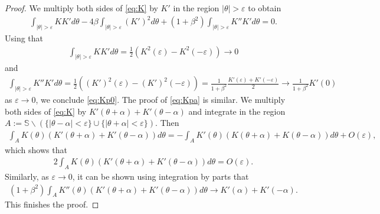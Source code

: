 \documentclass[10pt,a4paper]{amsart}
\newcommand{\alp}{\alpha}
\newcommand{\bbS}{\mathbb S}
\newcommand{\bt}{\beta}
\newcommand{\tht}{\theta}
\begin{document}
	\begin{proof}
		We multiply both sides of \eqref{eq:K} by $K'$ in the region $|\tht|>\varepsilon$ to obtain \begin{equation*}
			\begin{split}
				\int_{ |\tht |>\varepsilon} KK' d\tht - 4\bt \int_{ |\tht |>\varepsilon} (K')^2d\tht + (1+\bt^2) \int_{ |\tht |>\varepsilon} K''K' d\tht = 0. 
			\end{split}
		\end{equation*} Using that \begin{equation*}
			\begin{split}
				\int_{ |\tht |>\varepsilon} KK' d\tht = \frac12 \left( K^2(\varepsilon)-K^2(-\varepsilon) \right) \to 0
			\end{split}
		\end{equation*} and \begin{equation*}
			\begin{split}
				\int_{ |\tht |>\varepsilon} K''K' d\tht = \frac12 \left(  (K')^2(\varepsilon) - (K')^2(-\varepsilon) \right) = \frac{1}{1+\bt^2} \frac{ K'(\varepsilon) + K'(-\varepsilon) }{2} \to \frac{1}{1+\bt^2} K'(0)
			\end{split}
		\end{equation*} as $\varepsilon\to0$, we conclude \eqref{eq:Kp0}. The proof of \eqref{eq:Kpa} is similar. We multiply both sides of \eqref{eq:K} by $K'(\tht+\alp)+K'(\tht-\alp)$ and integrate in the region $A:= \bbS\backslash ( \{ |\tht-\alp|<\varepsilon \} \cup \{ |\tht+\alp|<\varepsilon \} )$. Then \begin{equation*}
			\begin{split}
				\int_A K(\tht) (K'(\tht+\alp)+K'(\tht-\alp)) d\tht  = -\int_A K'(\tht) ( K(\tht+\alp) + K(\tht-\alp) ) d\tht + O(\varepsilon),
			\end{split}
		\end{equation*} which shows that \begin{equation*}
			\begin{split}
				2\int_A K(\tht) (K'(\tht+\alp)+K'(\tht-\alp)) d\tht  = O(\varepsilon). 
			\end{split}
		\end{equation*} Similarly, as $\varepsilon\to0$, it can be shown using integration by parts that \begin{equation*}
			\begin{split}
				(1+\bt^2)\int_{A} K''(\tht)(K'(\tht+\alp)+K'(\tht-\alp)) d\tht \rightarrow K'(\alp) + K'(-\alp). 
			\end{split}
		\end{equation*} This finishes the proof. 
	\end{proof}
\end{document}
